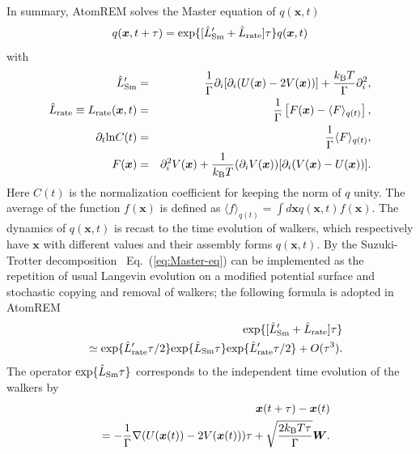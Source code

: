 \documentclass[preprint,12pt]{elsarticle}
\newcounter{bla}
\begin{document}
In summary, AtomREM solves the Master equation of $q({\bm x}, t)$
\begin{eqnarray}
q({\bm x},t+\tau)
={\rm exp}\{[\hat{L}'_{\rm Sm}+\hat{L}_{\rm rate}] \tau\}q({\bm x},t)
\label{eq:Master-eq}
\end{eqnarray}
with
\begin{eqnarray}
\hat{L}'_{\rm Sm}
&=&
\frac{1}{\Gamma}
\partial_{i} [\partial_i (U({\bm x})-2V({\bm x}))]+\frac{k_{\rm B}T}{\Gamma}\partial_{i}^2,
\\
\hat{L}_{\rm rate}
\equiv
L_{\rm rate}({\bm x}, t)
&=&
\frac{1}{\Gamma}
\left[
F({\bm x})-\langle F\rangle_{q(t)}
\right],
\label{eq:L-rate-def}
\\
\partial_t {\rm ln}C(t) &=& \frac{1}{\Gamma}\langle F\rangle_{q(t)},
\label{eq:C-timeevol}
\\
F({\bm x})
&=&
\partial_{i}^{2}V({\bm x})
+
\frac{1}{k_{\rm B}T}(\partial_{i}V({\bm x}))[\partial_{i}(V({\bm x})-U({\bm x}))]
.
\label{eq:Ffunc}
\end{eqnarray}
Here $C(t)$ is the normalization coefficient for keeping the norm of $q$ unity. The average of the function $f({\bm x})$ is defined as $\langle f\rangle_{q(t)} = \int d{\bm x} q({\bm x},t)f({\bm x})$. The dynamics of $q({\bm x}, t)$ is recast to the time evolution of walkers, which respectively have ${\bm x}$ with different values and their assembly forms $q({\bm x}, t)$. By the Suzuki-Trotter decomposition~\cite{Suzuki-Trotter-1-AMS1959,Suzuki-Trotter-2-CMP1976} Eq.~(\ref{eq:Master-eq}) can be implemented as the repetition of usual Langevin evolution on a modified potential surface and stochastic copying and removal of walkers; the following formula is adopted in AtomREM 
\begin{eqnarray}
&&{\rm exp}\{[\hat{L}'_{\rm Sm}+\hat{L}_{\rm rate}] \tau\}
\nonumber \\
&&\simeq
{\rm exp}\{\hat{L}'_{\rm rate} \tau/2\}
{\rm exp}\{\hat{L}_{\rm Sm} \tau\}
{\rm exp}\{\hat{L}'_{\rm rate} \tau/2\}
+ O(\tau^3)
.
\label{eq:timestep-decompose}
\end{eqnarray}
The operator ${\rm exp}\{\hat{L}_{\rm Sm} \tau\}$ corresponds to the independent time evolution of the walkers by
\begin{eqnarray}
&&{\bm x}(t+\tau)-{\bm x}(t) \nonumber \\
&&=-\frac{1}{\Gamma}\nabla (U({\bm x}(t))-2V({\bm x}(t)))\tau +  \sqrt{\frac{2k_{\rm B}T\tau}{\Gamma}} {\bm W}.
\label{eq:Lang_step}
\end{eqnarray}
\end{document}
